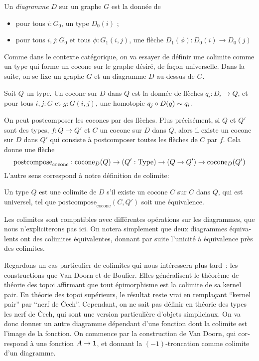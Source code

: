 \begin{otherlanguage}{french}
\begin{defifr}[Diagramme]
  Un {\em diagramme} $D$ sur un graphe $G$ est la donnée de
  \begin{itemize}
  \item pour tous $i:G_0$, un type $D_0(i)$ ;
  \item pour tous $i,j:G_0$ et tous $\phi : G_1(i,j)$, une flèche $D_1(\phi)
    : D_0(i) \to D_0(j)$
  \end{itemize}
\end{defifr}

Comme dans le contexte catégorique, on va essayer de définir une
colimite comme un type qui forme un cocone sur le graphe désiré, de
façon universelle. Dans la suite, on se fixe un graphe $G$ et un
diagramme $D$ au-dessus de $G$.

\begin{defifr}
  Soit $Q$ un type. Un cocone sur $D$ dans $Q$ est la donnée de
  flèches $q_i : D_i \to Q$, et pour tous $i,j:G$ et $g:G(i,j)$, une
  homotopie $q_j \circ D(g) \sim q_i$.
\end{defifr}

On peut postcomposer les cocones par des flèches. Plus précisément, si
$Q$ et $Q'$ sont des types, $f:Q \to Q'$ et $C$ un cocone sur $D$ dans
$Q$, alors il existe un cocone sur $D$ dans $Q'$ qui consiste à
postcomposer toutes les flèches de $C$ par $f$. Cela donne une flèche
\newcommand{\postcomposecocone}{\mathrm{postcompose}_{\mathrm{cocone}}}
\[\postcomposecocone : \cocone_D(Q) \to (Q':\Type) \to (Q \to Q') \to
  \cocone_D(Q') \]
L'autre sens correspond à notre définition de colimite:

\begin{defifr}[Colimite]
  Un type $Q$ est une colimite de $D$ s'il existe un cocone $C$ sur
  $C$ dans $Q$, qui est universel, \ie{} tel que
  $\postcomposecocone(C,Q')$ soit une équivalence.
\end{defifr}

Les colimites sont compatibles avec différentes opérations sur les
diagrammes, que nous n'expliciterons pas ici. On notera simplement que
deux diagrammes équivalents ont des colimites équivalentes, donnant
par suite l'unicité à équivalence près des colimites.

Regardons un cas particulier de colimites qui nous intéressera plus
tard~: les constructions que Van Doorn et de Boulier.
Elles généralisent le théorème de théorie des topoi affirmant que tout
épimorphisme est la colimite de sa kernel pair. En théorie des topoi
supérieurs, le résultat reste vrai en remplaçant ``kernel pair'' par
``nerf de \v{C}ech''. Cependant, on ne sait pas définir en
théorie des types les nerf de
\v{C}ech, qui sont une version particulière d'objets simpliciaux. On
va donc donner un autre diagramme dépendant d'une fonction dont la
colimite est l'image de la fonction. On commence par la construction
de Van Doorn, qui correspond à une fonction $A\to\mathbf{1}$, et donnant la
$(-1)$-troncation comme colimite d'un diagramme.




\end{otherlanguage}
